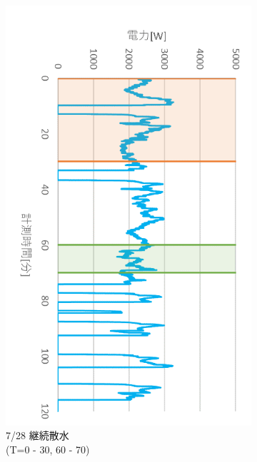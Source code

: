 \documentclass[a4j,fleqn,dvipdfmx,uplatex]{jsarticle}
\begin{document}
\begin{figure}[htb]
\begin{subfigure}[t]{0.32\linewidth}
    \includegraphics[width=\linewidth]{img/t_p/20220728.png}
    \caption{7/28 継続散水\\(T=0 - 30, 60 - 70)}\label{fig:h}
  \end{subfigure}\\
  \begin{subfigure}[t]{0.32\linewidth}
    \centering

\end{subfigure}
\end{figure}
\end{document}
